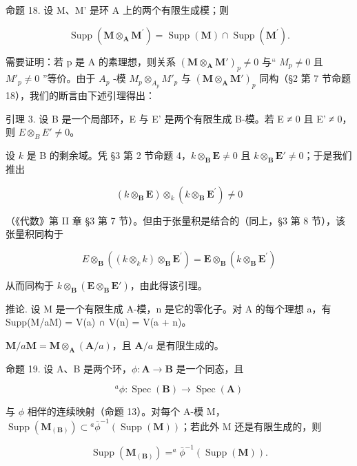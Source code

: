 命题 18. 设 M、M' 是环 A 上的两个有限生成模；则

\[
\operatorname{Supp} (\mathbf {M} \otimes_ {\mathbf {A}} \mathbf {M} ^ {\prime}) = \operatorname{Supp} (\mathbf {M}) \cap \operatorname{Supp} (\mathbf {M} ^ {\prime}).\tag{10}
\]

需要证明：若 p 是 A 的素理想，则关系 \((\mathbf{M} \otimes_{\mathbf{A}} \mathbf{M}')_{p} \neq 0\) 与`` \(M_{p} \neq 0\) 且 \(M'_{p} \neq 0\) ''等价。由于 \(A_{p}\) -模 \(M_{p} \otimes_{A_{p}} M'_{p}\) 与 \((\mathbf{M} \otimes_{\mathbf{A}} \mathbf{M}')_{p}\) 同构（§2 第 7 节命题 18），我们的断言由下述引理得出：

引理 3. 设 B 是一个局部环，E 与 E' 是两个有限生成 B-模。若 E ≠ 0 且 E' ≠ 0，则 \(E \otimes_{B} E' \neq 0\)。

设 \(k\) 是 B 的剩余域。凭 §3 第 2 节命题 4，\(k \otimes_{\mathbf{B}} \mathbf{E} \neq 0\) 且 \(k \otimes_{\mathbf{B}} \mathbf{E}' \neq 0\)；于是我们推出

\[
(k \otimes_ {\mathbf {B}} \mathbf {E}) \otimes_ {k} (k \otimes_ {\mathbf {B}} \mathbf {E} ^ {\prime}) \neq 0
\]

（《代数》第 II 章 §3 第 7 节）。但由于张量积是结合的（同上，§3 第 8 节），该张量积同构于

\[
E \otimes_ {\mathbf {B}} ((k \otimes_ {k} k) \otimes_ {\mathbf {B}} \mathbf {E} ^ {\prime}) = \mathbf {E} \otimes_ {\mathbf {B}} (k \otimes_ {\mathbf {B}} \mathbf {E} ^ {\prime})
\]

从而同构于 \(k \otimes_{\mathbf{B}} (\mathbf{E} \otimes_{\mathbf{B}} \mathbf{E}')\)，由此得该引理。

推论. 设 M 是一个有限生成 A-模，n 是它的零化子。对 A 的每个理想 a，有 Supp(M/aM) = V(a) ∩ V(n) = V(a + n)。

\(\mathbf{M} / a\mathbf{M} = \mathbf{M}\otimes_{\mathbf{A}}(\mathbf{A} / a)\)，且 \(\mathbf{A} / a\) 是有限生成的。

命题 19. 设 A、B 是两个环，\(\phi: \mathbf{A} \to \mathbf{B}\) 是一个同态，且

\[
^ {a} \phi : \operatorname{Spec} (\mathbf {B}) \rightarrow \operatorname{Spec} (\mathbf {A})
\]

与 \(\phi\) 相伴的连续映射（命题 13）。对每个 A-模 M，\(\operatorname{Supp}(\mathbf{M}_{(\mathbf{B})}) \subset {}^a\overline{\phi}^{-1}(\operatorname{Supp}(\mathbf{M}))\)；若此外 M 还是有限生成的，则

\[
\operatorname{Supp} (\mathbf {M} _ {(\mathbf {B})}) = ^ {a} \bar {\phi} ^ {- 1} (\operatorname{Supp} (\mathbf {M})).
\]

